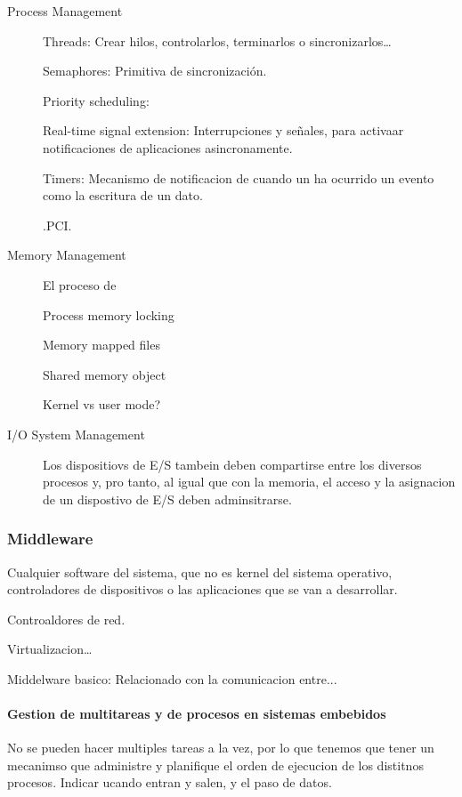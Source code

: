 \documentclass[12pt]{report} %
\begin{document}
\begin{description}
	\item[Process Management] 
	
	Threads: Crear hilos, controlarlos, terminarlos o sincronizarlos\dots

	Semaphores: Primitiva de sincronización.

	Priority scheduling:

	Real-time signal extension: Interrupciones y señales, para activaar notificaciones de aplicaciones asincronamente.

	Timers: Mecanismo de notificacion de cuando un ha ocurrido un evento como la escritura de un dato.

	.PCI.
	 
	\item[Memory Management]
	El proceso de 

	Process memory locking

	Memory mapped files

	Shared memory object

	Kernel vs user mode?
	
	\item[I/O System Management]  
	Los dispositiovs de E/S tambein deben compartirse entre los diversos procesos y, pro tanto, al igual que con la memoria, el acceso y la asignacion de un dispostivo de E/S deben adminsitrarse. 
\end{description}

\subsubsection{Middleware}

Cualquier software del sistema, que no es kernel del sistema operativo, controladores de  dispositivos o las aplicaciones que se van a desarrollar.

Controaldores de red.

Virtualizacion\dots

Middelware basico: Relacionado con la comunicacion entre... 



\paragraph{Gestion de multitareas y de procesos en sistemas embebidos}

No se pueden hacer multiples tareas a la vez, por lo que tenemos que tener un mecanimso que administre y planifique el orden de ejecucion de los distitnos procesos. Indicar ucando entran y salen, y el paso de datos.
\end{document}
